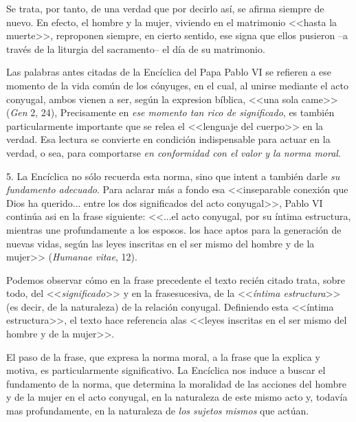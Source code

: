 \documentclass[letterpaper]{report}
\begin{document}
			Se trata, por tanto, de una verdad que por decirlo as\'i, 
			se afirma siempre de nuevo. En efecto, el hombre y la 
			mujer, viviendo en el matrimonio <<hasta la muerte>>, 
			reproponen siempre, en cierto sentido, ese signa que ellos 
			pusieron --a trav\'es de la liturgia del sacramento-- 
			el d\'ia de su matrimonio.
			 
			Las palabras antes citadas de la Enc\'iclica del Papa 
			Pablo VI se refieren a ese momento de la vida com\'un de los 
			c\'onyuges, en el cual, al unirse mediante el acto conyugal, 
			ambos vienen a ser, seg\'un la expresion b\'iblica, <<una sola 
			came>> (\textit{Gen} 2, 24), Precisamente en \textit{ese momento tan rico 
			de significado}, es tambi\'en particularmente importante 
			que se relea el <<lenguaje del cuerpo>> en la verdad. Esa 
			lectura se convierte en condici\'on indispensable para actuar 
			en la verdad, o sea, para comportarse \textit{en conformidad con 
			el valor y la norma moral}.
			
			5. La Enc\'iclica no s\'olo recuerda esta norma, sino que 
			intent a tambi\'en darle \textit{su fundamento adecuado}. Para 
			aclarar m\'as a fondo esa <<inseparable conexi\'on que Dios ha 
			querido... entre los dos significados del acto conyugal>>, 
			Pablo VI contin\'ua asi en la frase siguiente: <<...el acto 
			conyugal, por su \'intima estructura, mientras une profundamente 
			a los esposos. los hace aptos para la generaci\'on de 
			nuevas vidas, seg\'un las leyes inscritas en el ser mismo del 
			hombre y de la mujer>> (\textit{Humanae vitae}, 12).
			 
			Podemos observar c\'omo en la frase precedente el 
			texto reci\'en citado trata, sobre todo, del <<\textit{significado}>> 
			y en la frasesucesiva, de la <<\textit{\'intima estructura}>> 
			(es decir, de la naturaleza) de la relaci\'on conyugal. 
			Definiendo esta <<\'intima estructura>>, 
			el texto hace referencia alas <<leyes inscritas 
			en el ser mismo del hombre y de la mujer>>.
			
			El paso de la frase, que expresa la norma moral, a la 
			frase que la explica y motiva, es particularmente significativo. 
			La Enc\'iclica nos induce a buscar el fundamento 
			de la norma, que determina la moralidad de las acciones 
			del hombre y de la mujer en el acto conyugal, en la 
			naturaleza de este mismo acto y, todav\'ia mas profundamente, 
			en la naturaleza de \textit{los sujetos mismos} que act\'uan.
			
\end{document}
